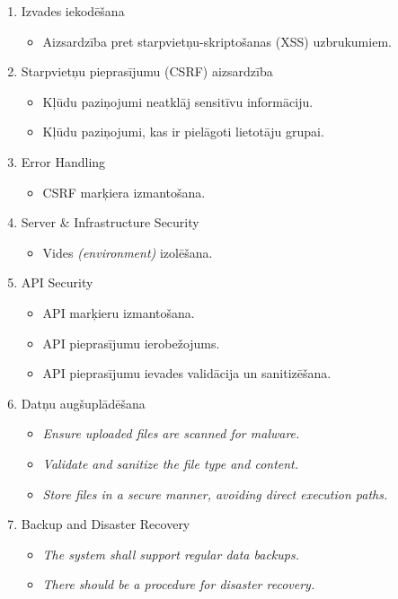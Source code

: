 \begin{enumerate}
	\item Izvades iekodēšana
	      \begin{itemize}
		      \item Aizsardzība pret starpvietņu-skriptošanas (XSS) uzbrukumiem.
	      \end{itemize}
	\item Starpvietņu pieprasījumu (CSRF) aizsardzība
	      \begin{itemize}
		      \item Kļūdu paziņojumi neatklāj sensitīvu informāciju.
		      \item Kļūdu paziņojumi, kas ir pielāgoti lietotāju grupai.
	      \end{itemize}
	\item Error Handling
	      \begin{itemize}
		      \item CSRF marķiera izmantošana.
	      \end{itemize}
	\item Server \& Infrastructure Security
	      \begin{itemize}
		      \item Vides \textit{(environment)} izolēšana.
	      \end{itemize}
	\item API Security
	      \begin{itemize}
		      \item API marķieru izmantošana.
		      \item API pieprasījumu ierobežojums.
		      \item API pieprasījumu ievades validācija un sanitizēšana.
	      \end{itemize}
	\item Datņu augšuplādēšana
	      \begin{itemize}
		      \item \textit{Ensure uploaded files are scanned for malware.}
		      \item \textit{Validate and sanitize the file type and content.}
		      \item \textit{Store files in a secure manner, avoiding direct execution paths.}
	      \end{itemize}
	\item Backup and Disaster Recovery
	      \begin{itemize}
		      \item \textit{The system shall support regular data backups.}
		      \item \textit{There should be a procedure for disaster recovery.}


\end{itemize}
\end{enumerate}

